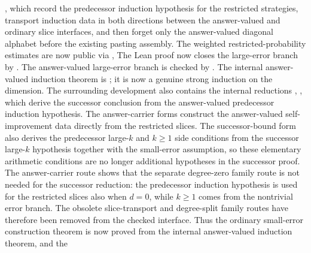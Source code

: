 	,
	which record the predecessor induction hypothesis for the restricted
	strategies, transport induction data in both directions between the
	answer-valued and ordinary slice interfaces, and then forget only the
	answer-valued diagonal alphabet before the existing pasting assembly. The weighted
	restricted-probability estimates are now public via
	,
	The Lean proof now closes the large-error branch by
	.  The
	answer-valued large-error branch is checked by
	.  The
	internal answer-valued induction theorem is
	; it is now a
	genuine strong induction on the dimension.  The surrounding development also
	contains the internal reductions
	,
	,
	which derive the successor conclusion from the answer-valued
	predecessor induction hypothesis.  The answer-carrier forms construct the
	answer-valued self-improvement data directly from the restricted slices.  The
	successor-bound form also derives the predecessor
	large-\(k\) and \(k\ge1\) side conditions from the successor large-\(k\)
	hypothesis together with the small-error assumption, so these elementary
	arithmetic conditions are no
	longer additional hypotheses in the successor proof.  The answer-carrier
	route shows that the separate degree-zero
	family route is not needed for the successor reduction: the predecessor
	induction hypothesis is used for the restricted slices also when \(d=0\),
	while \(k\ge1\) comes from the nontrivial error branch.  The obsolete
	slice-transport and degree-split family routes have therefore been removed
	from the checked interface.  Thus the ordinary small-error construction theorem
	is now proved from the internal answer-valued induction theorem, and the
